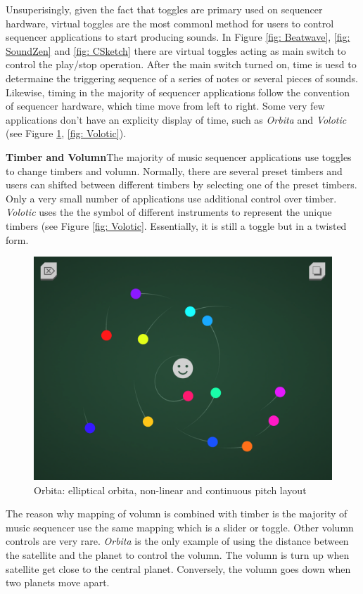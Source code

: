 Unsuperisingly, given the fact that toggles are primary used on sequencer hardware, virtual toggles are the most commonl method for users to control sequencer applications to start producing sounds. In Figure \ref{fig: Beatwave}, \ref{fig: SoundZen} and \ref{fig: CSketch} there are virtual toggles acting as main switch to control the play/stop operation. After the main switch turned on, time is uesd to determaine the triggering sequence of a series of notes or several pieces of sounds. Likewise, timing in the majority of sequencer applications follow the convention of sequencer hardware, which time move from left to right. Some very few applications don't have an explicity display of time, such as \textit{Orbita} and \textit{Volotic} (see Figure \ref{fig: Orbita}, \ref{fig: Volotic}).

\textbf{Timber and Volumn}The majority of music sequencer applications use toggles to change timbers and volumn. Normally, there are several preset timbers and users can shifted between different timbers by selecting one of the preset timbers. Only a very small number of applications use additional control over timber. \textit{Volotic} uses the the symbol of different instruments to represent the unique timbers (see Figure \ref{fig: Volotic}. Essentially, it is still a toggle but in a twisted form.

\bigskip
\begin{figure}[h]
  \includegraphics[width=12 cm]{images/Orbita.PNG}
  \centering
  \caption{Orbita: elliptical orbita, non-linear and continuous pitch layout}
  \label{fig: Orbita}
\end{figure}
\bigskip

The reason why mapping of volumn is combined with timber is the majority of music sequencer use the same mapping which is a slider or toggle. Other volumn controls are very rare. \textit{Orbita} is the only example of using the distance between the satellite and the planet to control the volumn. The volumn is turn up when satellite get close to the central planet. Conversely, the volumn goes down when two planets move apart.

